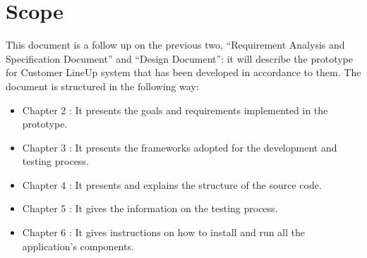 \section{Scope}

This document is a follow up on the previous two, “Requirement Analysis and Specification Document” and “Design Document”: it will describe the prototype for Customer LineUp system that has been developed in accordance to them. The document is structured in the following way:
\begin{itemize}
	\item Chapter 2 : It presents the goals and requirements implemented in the prototype.
	\item Chapter 3 : It presents the frameworks adopted for the development and testing process.
	\item Chapter 4 : It presents and explains the structure of the source code.
	\item Chapter 5 : It gives the information on the testing process.
	\item Chapter 6 : It gives instructions on how to install and run all the application's components.
\end{itemize}